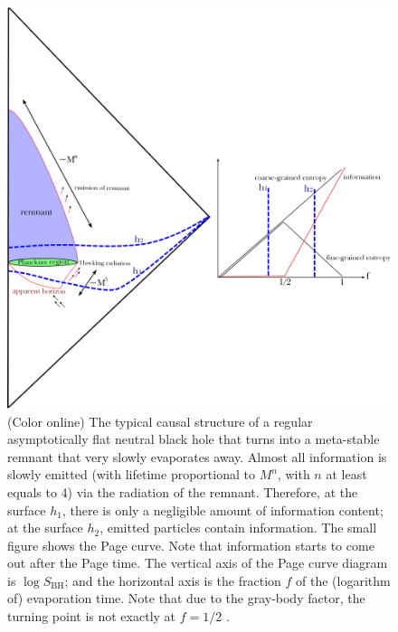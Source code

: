 \documentclass[12pt]{article}
\newcommand{\2}{$^2$}
\newcommand{\3}{$^3$}
\newcommand{\4}{$_4$}
\newcommand{\5}{$_5$}
\begin{document}
\begin{figure}
\begin{center}
\includegraphics[scale=0.45]{regular_remnant-eps-converted-to.pdf}
\caption{\label{fig:regular_remnant}(Color online) The typical causal structure of a regular asymptotically flat neutral black hole that turns into a meta-stable remnant that very slowly evaporates away. Almost all information is slowly emitted (with lifetime proportional to $M^n$, with $n$ at least equals to 4) via the radiation of the remnant. Therefore, at the surface $h_{1}$, there is only a negligible amount of 
information content; at the surface $h_{2}$, emitted particles contain information. The small figure shows the Page curve. Note that information starts to come out after the Page time. The vertical axis of the Page curve diagram is  $\log S_{\text{BH}}$; and the horizontal axis is the fraction $f$ of the (logarithm of) evaporation time. Note that due to the gray-body factor, the turning point is not exactly at $f=1/2$ \cite{page2}.}
\end{center}
\end{figure}
\end{document}
